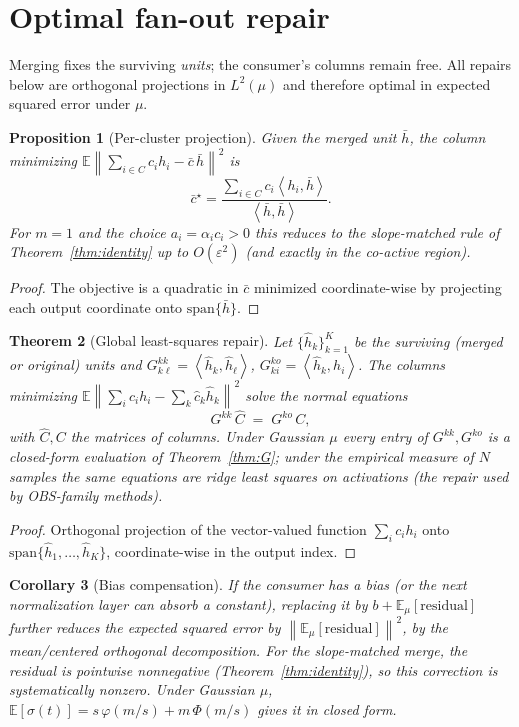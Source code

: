 \documentclass[11pt]{article}
\newtheorem{theorem}{Theorem}[section]
\newtheorem{proposition}[theorem]{Proposition}
\newtheorem{corollary}[theorem]{Corollary}
\theoremstyle{remark}
\newcommand{\E}{\mathbb{E}}
\newcommand{\relu}{\sigma}
\newcommand{\norm}[1]{\left\lVert #1 \right\rVert}
\newcommand{\ip}[2]{\left\langle #1, #2 \right\rangle}
\begin{document}
\section{Optimal fan-out repair}\label{sec:repair}

Merging fixes the surviving \emph{units}; the consumer's columns remain free.
All repairs below are orthogonal projections in $L^2(\mu)$ and therefore
optimal in expected squared error under $\mu$.

\begin{proposition}[Per-cluster projection]\label{prop:proj}
Given the merged unit $\bar h$, the column minimizing
$\E\norm{\sum_{i\in C} c_i h_i - \bar c\,\bar h}^2$ is
\[
  \bar c^\star = \frac{\sum_{i\in C} c_i \ip{h_i}{\bar h}}
  {\ip{\bar h}{\bar h}} .
\]
For $m=1$ and the choice $a_i = \alpha_i c_i > 0$ this reduces to the
slope-matched rule of Theorem~\ref{thm:identity} up to $O(\varepsilon^2)$
(and exactly in the co-active region).
\end{proposition}

\begin{proof}
The objective is a quadratic in $\bar c$ minimized coordinate-wise by
projecting each output coordinate onto $\mathrm{span}\{\bar h\}$.
\end{proof}

\begin{theorem}[Global least-squares repair]\label{thm:global}
Let $\{\hat h_k\}_{k=1}^{K}$ be the surviving (merged or original) units and
$G^{kk}_{k\ell} = \ip{\hat h_k}{\hat h_\ell}$,
$G^{ko}_{k i} = \ip{\hat h_k}{h_i}$. The columns minimizing
$\E\norm{\sum_i c_i h_i - \sum_k \hat c_k \hat h_k}^2$ solve the normal
equations
\[
  G^{kk}\, \widehat C \;=\; G^{ko}\, C ,
\]
with $\widehat C, C$ the matrices of columns. Under Gaussian $\mu$ every
entry of $G^{kk}, G^{ko}$ is a closed-form evaluation of
Theorem~\ref{thm:G}; under the empirical measure of $N$ samples the same
equations are ridge least squares on activations (the repair used by
OBS-family methods).
\end{theorem}

\begin{proof}
Orthogonal projection of the vector-valued function $\sum_i c_i h_i$ onto
$\mathrm{span}\{\hat h_1,\dots,\hat h_K\}$, coordinate-wise in the output
index.
\end{proof}

\begin{corollary}[Bias compensation]\label{cor:bias}
If the consumer has a bias (or the next normalization layer can absorb a
constant), replacing it by $b + \E_\mu[\text{residual}]$ further reduces the
expected squared error by $\norm{\E_\mu[\text{residual}]}^2$, by the
mean/centered orthogonal decomposition. For the slope-matched merge, the
residual is pointwise nonnegative (Theorem~\ref{thm:identity}), so this
correction is systematically nonzero. Under Gaussian $\mu$,
$\E[\relu(t)] = s\,\varphi(m/s) + m\,\Phi(m/s)$ gives it in closed form.
\end{corollary}
\end{document}
